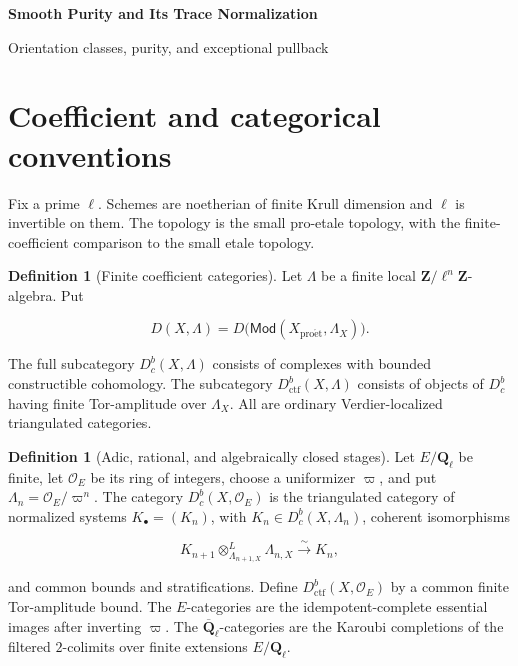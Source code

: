 \documentclass[10pt]{article}
\theoremstyle{definition}
\newtheorem{definition}[theorem]{Definition}
\newcommand{\Ql}{\mathbf Q_\ell}
\newcommand{\Qlb}{\overline{\mathbf Q}_\ell}
\newcommand{\OO}{\mathcal O}
\newcommand{\Dbc}{D^b_c}
\newcommand{\Dctf}{D^b_{\mathrm{ctf}}}
\begin{document}
\begin{center}
{\large\bfseries Smooth Purity and Its Trace Normalization\par}
\medskip
{\normalsize Orientation classes, purity, and exceptional pullback\par}
\end{center}

\begin{abstract}
For a smooth separated morphism \(f:X\to Y\) of pure relative dimension
\(d\), smooth purity identifies \(Rf^!\) with the shifted and twisted inverse
image \(Lf^*(d)[2d]\).  The statement is decomposed here into the Tate-line
construction, the normalized affine-line class, the affine-space product,
etale localization, gluing, coherence, and coefficient transport.  The
resulting trace is fixed by a geometric-fiber normalization.
\end{abstract}

\tableofcontents

\section{Coefficient and categorical conventions}

Fix a prime \(\ell\).  Schemes are noetherian of finite Krull dimension and
\(\ell\) is invertible on them.  The topology is the small pro-etale
topology, with the finite-coefficient comparison to the small etale topology.

\begin{definition}[Finite coefficient categories]
Let \(\Lambda\) be a finite local \(\mathbf Z/\ell^n\mathbf Z\)-algebra.  Put

\[
 D(X,\Lambda)=D\bigl(\mathsf{Mod}(X_{\mathrm{pro\acute et}},\Lambda_X)\bigr).
\]

The full subcategory \(\Dbc(X,\Lambda)\) consists of complexes with bounded
constructible cohomology.  The subcategory \(\Dctf(X,\Lambda)\) consists of
objects of \(\Dbc\) having finite Tor-amplitude over \(\Lambda_X\).  All are
ordinary Verdier-localized triangulated categories.
\end{definition}

\begin{definition}[Adic, rational, and algebraically closed stages]
Let \(E/\Ql\) be finite, let \(\OO_E\) be its ring of integers, choose a
uniformizer \(\varpi\), and put \(\Lambda_n=\OO_E/\varpi^n\).  The category
\(\Dbc(X,\OO_E)\) is the triangulated category of normalized systems
\(K_\bullet=(K_n)\), with \(K_n\in\Dbc(X,\Lambda_n)\), coherent isomorphisms

\[
 K_{n+1}\otimes^L_{\Lambda_{n+1,X}}\Lambda_{n,X}\xrightarrow{\sim}K_n,
\]

and common bounds and stratifications.  Define \(\Dctf(X,\OO_E)\) by a
common finite Tor-amplitude bound.  The \(E\)-categories are the
idempotent-complete essential images after inverting \(\varpi\).  The
\(\Qlb\)-categories are the Karoubi completions of the filtered \(2\)-colimits
over finite extensions \(E/\Ql\).
\end{definition}
\end{document}
